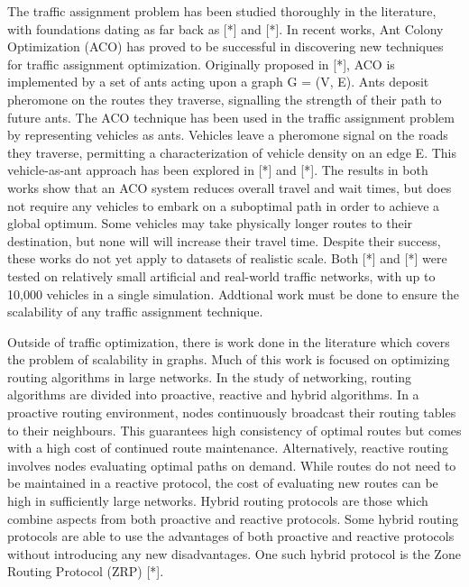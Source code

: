 \documentclass[conference]{IEEEtran}
\begin{document}
The traffic assignment problem has been studied thoroughly in the literature, with foundations dating as far back as [*] and [*]. In recent works, Ant Colony Optimization (ACO) has proved to be successful in discovering new techniques for traffic assignment optimization. Originally proposed in [*], ACO is implemented by a set of ants acting upon a graph G = (V, E). Ants deposit pheromone on the routes they traverse, signalling the strength of their path to future ants. The ACO technique has been used in the traffic assignment problem by representing vehicles as ants. Vehicles leave a pheromone signal on the roads they traverse, permitting a characterization of vehicle density on an edge E. This vehicle-as-ant approach has been explored in [*] and [*]. The results in both works show that an ACO system reduces overall travel and wait times, but does not require any vehicles to embark on a suboptimal path in order to achieve a global optimum. Some vehicles may take physically longer routes to their destination, but none will will increase their travel time. Despite their success, these works do not yet apply to datasets of realistic scale. Both [*] and [*] were tested on relatively small artificial and real-world traffic networks, with up to 10,000 vehicles in a single simulation. Addtional work must be done to ensure the scalability of any traffic assignment technique.

Outside of traffic optimization, there is work done in the literature which covers the problem of scalability in graphs. Much of this work is focused on optimizing routing algorithms in large networks. In the study of networking, routing algorithms are divided into proactive, reactive and hybrid algorithms. In a proactive routing environment, nodes continuously broadcast their routing tables to their neighbours. This guarantees high consistency of optimal routes but comes with a high cost of continued route maintenance. Alternatively, reactive routing involves nodes evaluating optimal paths on demand. While routes do not need to be maintained in a reactive protocol, the cost of evaluating new routes can be high in sufficiently large networks. Hybrid routing protocols are those which combine aspects from both proactive and reactive protocols. Some hybrid routing protocols are able to use the advantages of both proactive and reactive protocols without introducing any new disadvantages. One such hybrid protocol is the Zone Routing Protocol (ZRP) [*]. 

\end{document}
